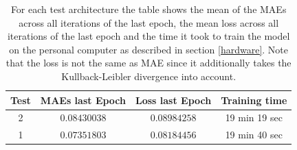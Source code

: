 \begin{center}
    \begin{table}[H]
        \centering
        \begin{tabular}{ | c | c | c | c | }
            \hline
            Test &MAEs last Epoch & Loss last Epoch & Training time\\ \hline
            2 & $0.08430038$  & $0.08984258$  & 19 min 19 sec  \\  
            1 & $0.07351803$  & $0.08184456$  & 19 min 40 sec  \\  
            \hline
        \end{tabular} 
        \caption{For each test architecture the table shows the mean of the MAEs across all iterations of the last
        epoch, the mean loss across all iterations of the last epoch and the time it took to train the model
        on the personal computer as described in section \ref{hardware}. Note that the loss is not the same
        as MAE since it additionally takes the Kullback-Leibler divergence into account.}
    \end{table} \label{table_maes3}
\end{center}

